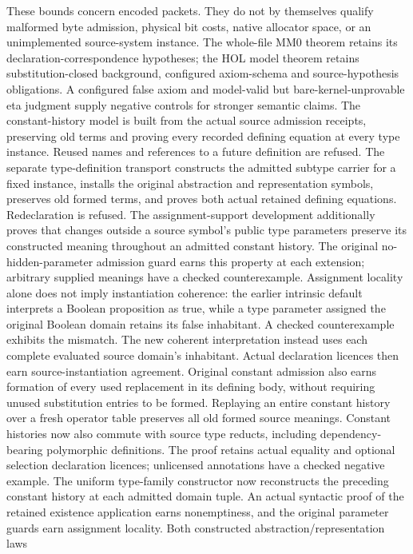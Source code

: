 \documentclass[11pt]{article}
\begin{document}
These bounds concern encoded packets. They do not by themselves qualify
malformed byte admission, physical bit costs, native allocator space, or
an unimplemented source-system instance. The whole-file MM0 theorem retains
its declaration-correspondence hypotheses; the HOL model theorem retains
substitution-closed background, configured axiom-schema and source-hypothesis
obligations. A configured false axiom and model-valid but bare-kernel-unprovable
eta judgment supply negative controls for stronger semantic claims.
The constant-history model is built from the actual source admission
receipts, preserving old terms and proving every recorded defining equation
at every type instance. Reused names and references to a future definition
are refused. The separate type-definition transport constructs the admitted
subtype carrier for a fixed instance, installs the original abstraction
and representation symbols, preserves old formed terms, and proves both
actual retained defining equations. Redeclaration is refused. The
assignment-support development additionally proves that changes outside
a source symbol's public type parameters preserve its constructed meaning
throughout an admitted constant history. The original no-hidden-parameter
admission guard earns this property at each extension; arbitrary supplied
meanings have a checked counterexample. Assignment locality alone does not
imply instantiation coherence: the earlier intrinsic default interprets a
Boolean proposition as true, while a type parameter assigned the original
Boolean domain retains its false inhabitant. A checked counterexample
exhibits the mismatch. The new coherent interpretation instead uses each
complete evaluated source domain's inhabitant. Actual declaration licences
then earn source-instantiation agreement. Original constant admission also
earns formation of every used replacement in its defining body, without
requiring unused substitution entries to be formed. Replaying an entire
constant history over a fresh operator table preserves all old formed
source meanings. Constant histories now also commute with source type
reducts, including dependency-bearing polymorphic definitions. The proof
retains actual equality and optional selection declaration licences;
unlicensed annotations have a checked negative example. The uniform
type-family constructor now reconstructs the preceding constant history at
each admitted domain tuple. An actual syntactic proof of the retained
existence application earns nonemptiness, and the original parameter guards
earn assignment locality. Both constructed abstraction/representation laws
\end{document}
